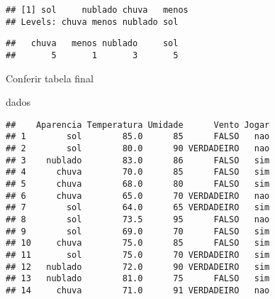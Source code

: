 \documentclass[
]{article}
\newenvironment{Shaded}{\begin{snugshade}}{\end{snugshade}}
\newcommand{\FunctionTok}[1]{\textcolor[rgb]{0.00,0.00,0.00}{#1}}
\newcommand{\NormalTok}[1]{#1}
\newcommand{\OtherTok}[1]{\textcolor[rgb]{0.56,0.35,0.01}{#1}}
\newcommand{\SpecialCharTok}[1]{\textcolor[rgb]{0.00,0.00,0.00}{#1}}
\newcommand{\StringTok}[1]{\textcolor[rgb]{0.31,0.60,0.02}{#1}}
\begin{document}
\begin{verbatim}
## [1] sol     nublado chuva   menos  
## Levels: chuva menos nublado sol
\end{verbatim}

\begin{Shaded}
\end{Shaded}

\begin{verbatim}
##   chuva   menos nublado     sol 
##       5       1       3       5
\end{verbatim}

\begin{Shaded}
\end{Shaded}

Conferir tabela final

\begin{Shaded}
\begin{Highlighting}[]
\NormalTok{dados}
\end{Highlighting}
\end{Shaded}

\begin{verbatim}
##    Aparencia Temperatura Umidade      Vento Jogar
## 1        sol        85.0      85      FALSO   nao
## 2        sol        80.0      90 VERDADEIRO   nao
## 3    nublado        83.0      86      FALSO   sim
## 4      chuva        70.0      85      FALSO   sim
## 5      chuva        68.0      80      FALSO   sim
## 6      chuva        65.0      70 VERDADEIRO   nao
## 7        sol        64.0      65 VERDADEIRO   sim
## 8        sol        73.5      95      FALSO   nao
## 9        sol        69.0      70      FALSO   sim
## 10     chuva        75.0      85      FALSO   sim
## 11       sol        75.0      70 VERDADEIRO   sim
## 12   nublado        72.0      90 VERDADEIRO   sim
## 13   nublado        81.0      75      FALSO   sim
## 14     chuva        71.0      91 VERDADEIRO   nao
\end{verbatim}
\end{document}
